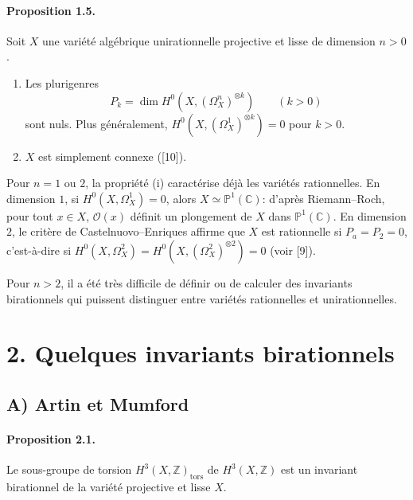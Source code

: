 \documentclass[10pt]{article}
\newcommand{\C}{\mathbb C}
\newcommand{\Pj}{\mathbb P}
\newcommand{\Z}{\mathbb Z}
\newcommand{\cO}{\mathcal O}
\newcommand{\tors}{\operatorname{tors}}
\begin{document}
\paragraph{Proposition 1.5.} Soit \(X\) une variété algébrique unirationnelle projective et lisse de dimension \(n>0\).
\begin{enumerate}[label=(\roman*)]
\item Les plurigenres
\[
P_k=\dim H^0(X,(\Omega_X^n)^{\otimes k})\qquad(k>0)
\]
sont nuls. Plus généralement, \(H^0(X,(\Omega_X^1)^{\otimes k})=0\) pour \(k>0\).
\item \(X\) est simplement connexe ([10]).
\end{enumerate}
Pour \(n=1\) ou \(2\), la propriété (i) caractérise déjà les variétés rationnelles. En dimension \(1\), si \(H^0(X,\Omega_X^1)=0\), alors \(X\simeq\Pj^1(\C)\): d'après Riemann--Roch, pour tout \(x\in X\), \(\cO(x)\) définit un plongement de \(X\) dans \(\Pj^1(\C)\). En dimension \(2\), le critère de Castelnuovo--Enriques affirme que \(X\) est rationnelle si \(P_a=P_2=0\), c'est-à-dire si \(H^0(X,\Omega_X^2)=H^0(X,(\Omega_X^2)^{\otimes2})=0\) (voir [9]).

Pour \(n>2\), il a été très difficile de définir ou de calculer des invariants birationnels qui puissent distinguer entre variétés rationnelles et unirationnelles.

\section*{2. Quelques invariants birationnels}

\subsection*{A) Artin et Mumford}

\paragraph{Proposition 2.1.} Le sous-groupe de torsion \(H^3(X,\Z)_{\tors}\) de \(H^3(X,\Z)\) est un invariant birationnel de la variété projective et lisse \(X\).
\end{document}
